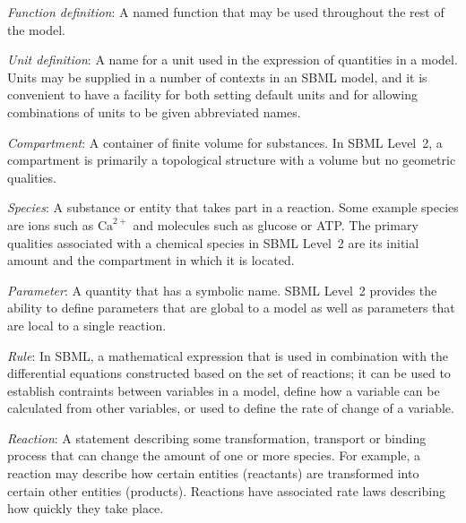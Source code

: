 \documentclass[10pt,twocolumntoc]{cekarticle}
\begin{document}
\begin{description}

\item \emph{Function definition}: A named function that may be used
  throughout the rest of the model.
    
\item \emph{Unit definition}: A name for a unit used in the expression of
  quantities in a model.  Units may be supplied in a number of contexts in
  an SBML model, and it is convenient to have a facility for both setting
  default units and for allowing combinations of units to be given
  abbreviated names.

\item \emph{Compartment}: A container of finite volume for substances.  In
  SBML Level~2, a compartment is primarily a topological structure with a
  volume but no geometric qualities.
  
\item \emph{Species}: A substance or entity that takes part in a reaction.
  Some example species are ions such as $\text{Ca}^{2+}$ and molecules such
  as glucose or ATP.  The primary qualities associated with a chemical
  species in SBML Level~2 are its initial amount and the compartment in
  which it is located.
  
\item \emph{Parameter}: A quantity that has a symbolic name.  SBML Level~2
  provides the ability to define parameters that are global to a model as
  well as parameters that are local to a single reaction.
 
\item \emph{Rule}: In SBML, a mathematical expression that is used in
  combination with the differential equations constructed based on the set
  of reactions; it can be used to establish contraints between variables in
  a model, define how a variable can be calculated from other variables,
  or used to define the rate of change of a variable.

\item \emph{Reaction}: A statement describing some transformation,
  transport or binding process that can change the amount of one or more
  species.  For example, a reaction may describe how certain entities
  (reactants) are transformed into certain other entities (products).
  Reactions have associated rate laws describing how quickly they take
  place.

\end{description}
\end{document}
